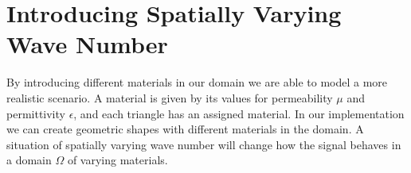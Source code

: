 \documentclass[10pt,a4paper]{article}
\begin{document}
\section*{Introducing Spatially Varying Wave Number}
By introducing different materials in our domain we are able to model a more realistic scenario. A material is given by its values for permeability $\mu$ and permittivity $\epsilon$, and each triangle has an assigned material. In our implementation we can create geometric shapes with different materials in the domain. A situation of spatially varying wave number will change how the signal behaves in a domain $\Omega$ of varying materials.
\end{document}
